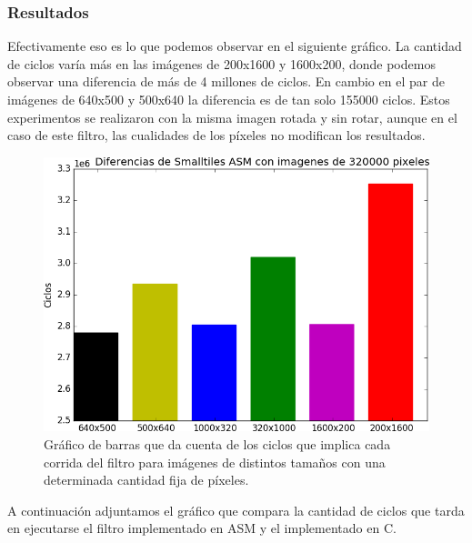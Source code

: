 \subsubsection{Resultados}
\par{Efectivamente eso es lo que podemos observar en el siguiente gráfico. La cantidad de ciclos varía más en las imágenes de 200x1600 y 1600x200, donde podemos observar una diferencia de más de 4 millones de ciclos. En cambio en el par de imágenes de 640x500 y 500x640 la diferencia es de tan solo 155000 ciclos. Estos experimentos se realizaron con la misma imagen rotada y sin rotar, aunque en el caso de este filtro, las cualidades de los píxeles no modifican los resultados.}

\begin{figure}[H]
\centering
\captionsetup{justification=centering}
\includegraphics[width = 15 cm, height = 10 cm]{imagenes/distintostamanos.png}
\caption[center]{Gráfico de barras que da cuenta de los ciclos que implica cada corrida del filtro para imágenes de distintos tamaños con una determinada cantidad fija de píxeles.}
\end{figure}
	
\par{A continuación adjuntamos el gráfico que compara la cantidad de ciclos que tarda en ejecutarse el filtro implementado en ASM y el implementado en C.}

